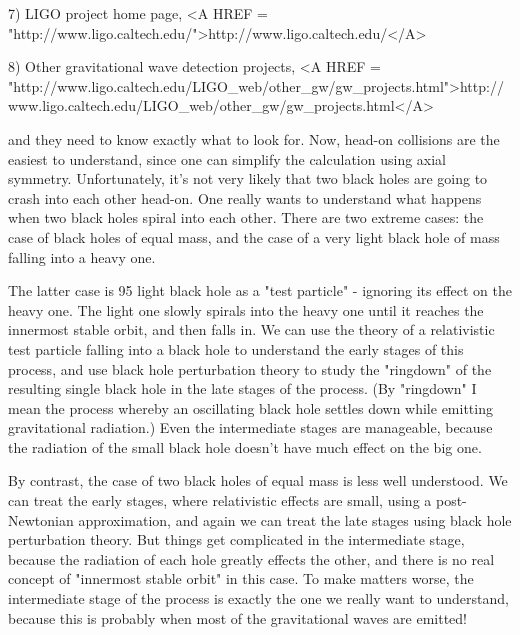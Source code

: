 7) LIGO project home page, <A HREF = "http://www.ligo.caltech.edu/">http://www.ligo.caltech.edu/</A>

8) Other gravitational wave detection projects, 
<A HREF = "http://www.ligo.caltech.edu/LIGO_web/other_gw/gw_projects.html">http://www.ligo.caltech.edu/LIGO_web/other_gw/gw_projects.html</A>

and they need to know exactly what to look for.   Now, head-on
collisions are the easiest to understand, since one can simplify
the calculation using axial symmetry.  Unfortunately, it's not 
very likely that two black holes are going to crash into each 
other head-on.  One really wants to understand what happens when
two black holes spiral into each other.  There are two extreme 
cases: the case of black holes of equal mass, and the case of 
a very light black hole of mass falling into a heavy one.

The latter case is 95%
light black hole as a "test particle" - ignoring its effect 
on the heavy one.  The light one slowly spirals into the
heavy one until it reaches the innermost stable orbit, and then
falls in.   We can use the theory of a relativistic test particle
falling into a black hole to understand the early stages of this
process, and use black hole perturbation theory to study the
"ringdown" of the resulting single black hole in the late stages
of the process.  (By "ringdown" I mean the process whereby an
oscillating black hole settles down while emitting gravitational 
radiation.)  Even the intermediate stages are manageable, because
the radiation of the small black hole doesn't have much effect on 
the big one.

By contrast, the case of two black holes of equal mass is less
well understood.  We can treat the early stages, where relativistic
effects are small, using a post-Newtonian approximation, and
again we can treat the late stages using black hole perturbation
theory.  But things get complicated in the intermediate stage,
because the radiation of each hole greatly effects the other, 
and there is no real concept of "innermost stable orbit" in this
case.  To make matters worse, the intermediate stage of the process
is exactly the one we really want to understand, because this is
probably when most of the gravitational waves are emitted!

